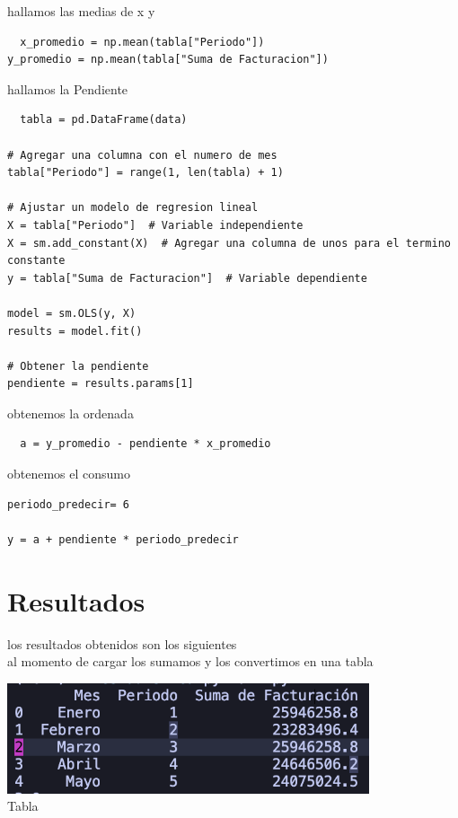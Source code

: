 \documentclass{article}
\begin{document}
hallamos las medias de x y
\begin{lstlisting}
  x_promedio = np.mean(tabla["Periodo"])
y_promedio = np.mean(tabla["Suma de Facturacion"])
\end{lstlisting}
hallamos la Pendiente
\begin{lstlisting}
  tabla = pd.DataFrame(data)

# Agregar una columna con el numero de mes
tabla["Periodo"] = range(1, len(tabla) + 1)

# Ajustar un modelo de regresion lineal
X = tabla["Periodo"]  # Variable independiente
X = sm.add_constant(X)  # Agregar una columna de unos para el termino constante
y = tabla["Suma de Facturacion"]  # Variable dependiente

model = sm.OLS(y, X)
results = model.fit()

# Obtener la pendiente
pendiente = results.params[1]
\end{lstlisting}
obtenemos la ordenada
\begin{lstlisting}
  a = y_promedio - pendiente * x_promedio
\end{lstlisting}
obtenemos el consumo
\begin{lstlisting}
periodo_predecir= 6

y = a + pendiente * periodo_predecir
\end{lstlisting}
\section{Resultados}

  los resultados obtenidos son los siguientes
  \\
  
  al momento de cargar los sumamos y los convertimos en una tabla
  \\

  \begin{minipage}{\textwidth}
    \centering
    \includegraphics[width=0.8\textwidth]{./img/Captura de pantalla 2023-07-05 a la(s) 20.14.21.png}
    \\
    {Tabla}
    \label{fig:etiqueta}
  \end{minipage}
\end{document}
